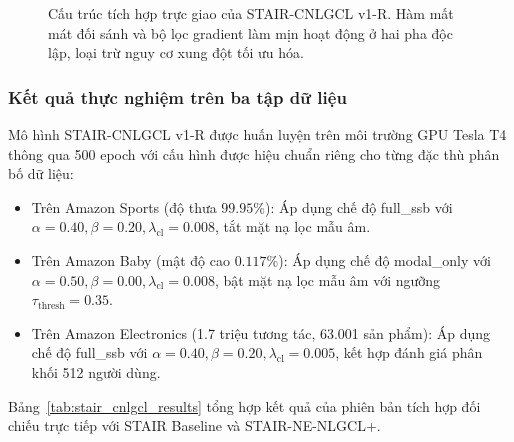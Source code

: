 \begin{figure}[H]
\caption{Cấu trúc tích hợp trực giao của STAIR-CNLGCL v1-R. Hàm mất mát đối sánh và bộ lọc gradient làm mịn hoạt động ở hai pha độc lập, loại trừ nguy cơ xung đột tối ưu hóa.}
\label{fig:stair_cnlgcl_v1_r_architecture}
\end{figure}

\subsubsection{Kết quả thực nghiệm trên ba tập dữ liệu}

Mô hình STAIR-CNLGCL v1-R được huấn luyện trên môi trường GPU Tesla T4 thông qua 500 epoch với cấu hình được hiệu chuẩn riêng cho từng đặc thù phân bố dữ liệu:
\begin{itemize}[leftmargin=*]
    \item Trên Amazon Sports (độ thưa $99.95\%$): Áp dụng chế độ full\_ssb với $\alpha = 0.40, \beta = 0.20, \lambda_{\text{cl}} = 0.008$, tắt mặt nạ lọc mẫu âm.
    \item Trên Amazon Baby (mật độ cao $0.117\%$): Áp dụng chế độ modal\_only với $\alpha = 0.50, \beta = 0.00, \lambda_{\text{cl}} = 0.008$, bật mặt nạ lọc mẫu âm với ngưỡng $\tau_{\text{thresh}} = 0.35$.
    \item Trên Amazon Electronics (1.7 triệu tương tác, 63.001 sản phẩm): Áp dụng chế độ full\_ssb với $\alpha = 0.40, \beta = 0.20, \lambda_{\text{cl}} = 0.005$, kết hợp đánh giá phân khối 512 người dùng.
\end{itemize}

Bảng~\ref{tab:stair_cnlgcl_results} tổng hợp kết quả của phiên bản tích hợp đối chiếu trực tiếp với STAIR Baseline và STAIR-NE-NLGCL+.


